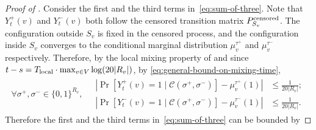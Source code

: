 \documentclass[11pt]{amsart}
\newcommand{\htodo}[1]{\todo[color=green!30]{Heng: #1}}
\renewcommand{\Pr}{\mathop{\mathrm{Pr}}\nolimits}
\def\+#1{\mathcal{#1}}
\renewcommand{\P}{\Pr}
\theoremstyle{definition}
\theoremstyle{remark}
\begin{document}
\begin{proof}[Proof of ]
Consider the first and the third terms in~\eqref{eq:sum-of-three}.
Note that $Y_t^+(v)$ and  $Y_t^-(v)$ both follow the censored transition matrix $P_{S_v}^{\textnormal{censored}}$. The configuration outside $S_v$ is fixed in the censored process, and the configuration inside $S_v$ converges to the conditional marginal distribution $\mu_v^{\tau^+}$ and $\mu_v^{\tau^-}$ respectively. 
Therefore, by the local mixing property of  and since $ t- s = T_{\textnormal{local}} \cdot \max_{v \in V}\log (20 | R_v|)$, by \eqref{eq:general-bound-on-mixing-time},
\begin{align*}
    \forall \sigma^+,\sigma^- \in \{0,1\}^{R_v},\quad
\begin{split}
    \left | \P[Y_t^+(v)=1\mid\mathcal{C}(\sigma^+,\sigma^-)] -\mu_v^{\tau^+}(1) \right | &\leq \frac{1}{20|R_v|};\\
    \left | \P[Y_t^-(v)=1\mid\mathcal{C}(\sigma^+,\sigma^-)] -\mu_v^{\tau^-}(1) \right | &\leq \frac{1}{20|R_v|}.
\end{split}
\end{align*}
Therefore the first and the third terms in~\eqref{eq:sum-of-three} can be bounded by

\end{proof}
\end{document}
